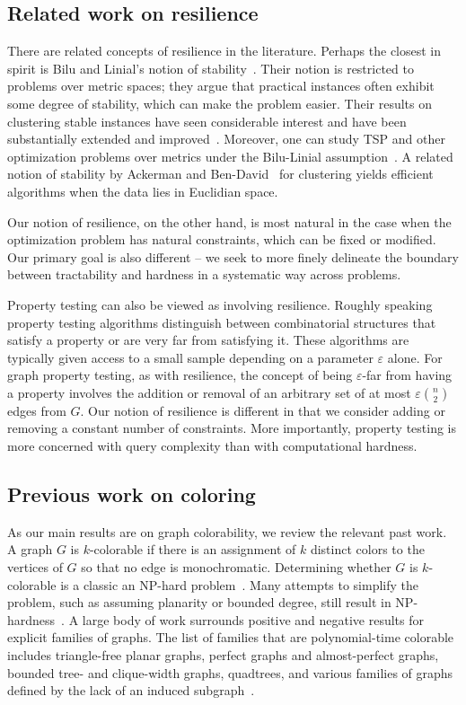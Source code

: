 \documentclass{llncs}
\begin{document}
\subsection{Related work on resilience}

There are related concepts of resilience in the literature. Perhaps the closest
in spirit is Bilu and Linial's notion of stability~\cite{BL12}.  Their notion
is restricted to problems over metric spaces; they argue that practical
instances often exhibit some degree of stability, which can make the problem
easier.  Their results on clustering stable instances have seen considerable
interest and have been substantially extended and
improved~\cite{ABS10,BL12,Rey11}.  Moreover, one can study TSP and other
optimization problems over metrics under the Bilu-Linial
assumption~\cite{MSSW11}.  A related notion of stability by Ackerman and
Ben-David~\cite{AckermanB09} for clustering yields efficient algorithms when
the data lies in Euclidian space.

Our notion of resilience, on the other hand, is most natural in the case when
the optimization problem has natural constraints, which can be fixed or
modified.  Our primary goal is also different -- we seek to more finely
delineate the boundary between tractability and hardness in a systematic way
across problems.

Property testing can also be viewed as involving resilience. Roughly speaking
property testing algorithms distinguish between combinatorial structures that
satisfy a property or are very far from satisfying it. These algorithms are
typically given access to a small sample depending on a parameter $\varepsilon$
alone. For graph property testing, as with resilience, the concept of being
$\varepsilon$-far from having a property involves the addition or removal of an
arbitrary set of at most $\varepsilon \binom{n}{2}$ edges from $G$. Our notion
of resilience is different in that we consider adding or removing a constant
number of constraints. More importantly, property testing is more concerned
with query complexity than with computational hardness.

\subsection{Previous work on coloring}

As our main results are on graph colorability, we review the relevant past
work. A graph $G$ is $k$-colorable if there is an assignment of $k$ distinct
colors to the vertices of $G$ so that no edge is monochromatic. Determining
whether $G$ is $k$-colorable is a classic an NP-hard problem~\cite{Karp72}.
Many attempts to simplify the problem, such as assuming planarity or bounded
degree, still result in NP-hardness~\cite{Dailey80}. A large body of work
surrounds positive and negative results for explicit families of graphs. The
list of families that are polynomial-time colorable includes triangle-free
planar graphs, perfect graphs and almost-perfect graphs, bounded tree- and
clique-width graphs, quadtrees, and various families of graphs defined by the
lack of an induced subgraph~\cite{Cai03,EBH99,HMM10,Ko03,KKTW01}.
\end{document}
